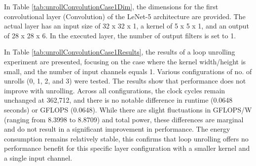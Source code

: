 In Table \ref{tab:unrollConvolutionCase1Dim}, the dimensions for the first convolutional layer (Convolution) of the LeNet-5 architecture are provided. The actual layer has an input size of 32 x 32 x 1, a kernel of 5 x 5 x 1, and an output of 28 x 28 x 6. In the executed layer, the number of output filters is set to 1.
\\
\begin{table}[H]
\centering
\caption{Loop unrolling results}
\label{tab:unrollConvolutionCase1Results}
\end{table}

In Table \ref{tab:unrollConvolutionCase1Results}, the results of a loop unrolling experiment are presented, focusing on the case where the kernel width/height is small, and the number of input channels equals 1. Various configurations of no. of unrolls (0, 1, 2, and 3) were tested. The results show that performance does not improve with unrolling. Across all configurations, the clock cycles remain unchanged at 362,712, and there is no notable difference in runtime (0.0648 seconds) or GFLOPS (0.0648). While there are slight fluctuations in GFLOPS/W (ranging from 8.3998 to 8.8709) and total power, these differences are marginal and do not result in a significant improvement in performance. The energy consumption remains relatively stable, this confirms that loop unrolling offers no performance benefit for this specific layer configuration with a smaller kernel and a single input channel.


